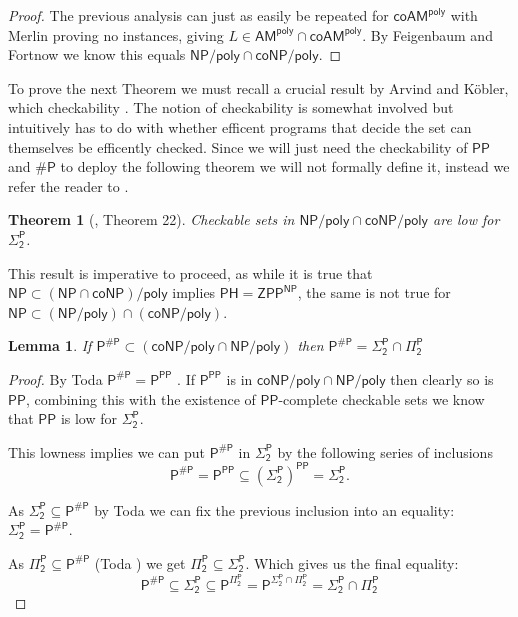 \documentclass[10pt,a4paper]{article}
\newtheorem*{theorem*}{Theorem}
\newtheorem{lemma}[theorem]{Lemma}
\begin{document}
\begin{proof}
    The previous analysis can just as easily be repeated for $\mathsf{coAM^{poly}}$ with Merlin proving no instances, giving $L\in \mathsf{AM^{poly} \cap coAM^{poly}}$. By Feigenbaum and Fortnow we know this equals $\mathsf{NP/poly \cap coNP/poly}$.
\end{proof}

To prove the next Theorem we must recall a crucial result by Arvind and Köbler, which checkability \cite{ARVIND2002257,zoo}. The notion of checkability is somewhat involved but intuitively has to do with whether efficent programs that decide the set can themselves be efficently checked. Since we will just need the checkability of $\mathsf{PP}$ and $\mathsf{\# P}$ to deploy the following theorem we will not formally define it, instead we refer the reader to \cite{ARVIND2002257, blum1995designing}.

\begin{theorem*}[\cite{ARVIND2002257}, Theorem 22]
    Checkable sets in $\mathsf{NP/poly \cap coNP/poly}$ are low for $\mathsf{\Sigma_2^P}$.
\end{theorem*}

This result is imperative to proceed, as while it is true that $\mathsf{NP\subset (NP\cap coNP)/poly}$ implies $\mathsf{PH=ZPP^{NP}}$, the same is not true for $\mathsf{NP\subset (NP/poly)\cap (coNP/poly)}$.

\begin{lemma}\label{lma: sharp P in conp/poly}
    If $\mathsf{P^{\# P}}\subset (\mathsf{coNP/poly \cap NP/poly})$ then $\mathsf{P^{\# P}=\Sigma_2^P\cap \Pi_2^P}$
\end{lemma}
\begin{proof}
By Toda $\mathsf{P^{\#P}=P^{PP}}$ \cite{toda1991pp}.    
    If $\mathsf{P^{PP}}$ is in $\mathsf{\mathsf{coNP/poly \cap NP/poly}}$ then clearly so is $\mathsf{PP}$, combining this with the existence of $\mathsf{PP}$-complete checkable sets \cite{ARVIND2002257} we know that $\mathsf{PP}$ is low for $\mathsf{\Sigma_2^P}$.

    This lowness implies we can put  $\mathsf{P^{\# P}}$ in $\mathsf{\Sigma_2^P}$ by the following series of inclusions
    \[
    \mathsf{
    P^{\#P}=P^{PP}\subseteq (\Sigma_2^P)^{PP} = \Sigma_2^P.
    }
    \]

    As $\mathsf{\Sigma_2^P\subseteq P^{\# P}}$ by Toda \cite{toda1991pp} we can fix the previous inclusion into an equality: $\mathsf{\Sigma_2^P =  P^{\# P}}$.

    As $\mathsf{\Pi_2^P \subseteq P^{\# P}}$ (Toda \cite{toda1991pp}) we get $\mathsf{\Pi_2^P\subseteq \Sigma_2^P}$.
    Which gives us the final equality:
    \[
    \mathsf{P^{\# P} \subseteq \Sigma_2^P \subseteq P^{\Pi_2^P}= P^{\Sigma_2^P\cap\Pi_2^P}=\Sigma_2^P\cap\Pi_2^P}
    \]
\end{proof}
\end{document}
